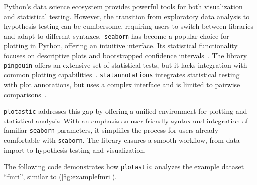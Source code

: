 %
\label{sec:C2_need}%
Python's data science ecosystem provides powerful tools for both visualization
and statistical testing. However, the transition from exploratory data analysis
to hypothesis testing can be cumbersome, requiring users to switch between
libraries and adapt to different syntaxes.~\texttt{seaborn} has become a popular
choice for plotting in Python, offering an intuitive interface. Its statistical
functionality focuses on descriptive plots and bootstrapped confidence
intervals~\cite{waskomSeabornStatisticalData2021}. The library \texttt{pingouin}
offers an extensive set of statistical tests, but it lacks integration with
common plotting capabilities~\cite{vallatPingouinStatisticsPython2018}.
\texttt{statannotations} integrates statistical testing with plot annotations,
but uses a complex interface and is limited to pairwise
comparisons~\cite{charlierTrevismdStatannotationsV02022}.

\texttt{plotastic} addresses this gap by offering a unified environment for
plotting and statistical analysis. With an emphasis on user-friendly
syntax and integration of familiar \texttt{seaborn} parameters, it simplifies
the process for users already comfortable with \texttt{seaborn}. The library
ensures a smooth workflow, from data import to hypothesis testing and
visualization.



\newpage



%
\label{sec:C2_example}%
The following code demonstrates how \texttt{plotastic} analyzes the
example dataset ``fmri'', similar to \citet{waskomSeabornStatisticalData2021}
(\autoref{fig:examplefmri}).

\vspace{\vfull}

